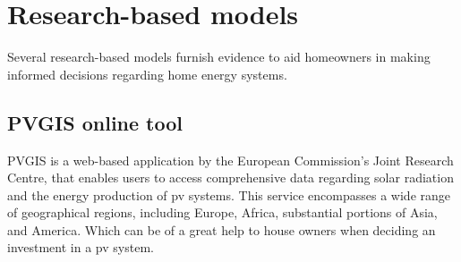 \section{Research-based models}

Several research-based models furnish evidence to aid homeowners in making informed decisions regarding home energy systems.

\subsection{PVGIS online tool}
PVGIS \cite{pvgis} is a web-based application by the European Commission's Joint Research Centre, 
that enables users to access comprehensive data regarding solar radiation and the energy production of \gls{pv} systems. 
This service encompasses a wide range of geographical regions, including Europe, Africa, substantial portions of Asia, and America.
Which can be of a great help to house owners when deciding an investment in a \gls{pv} system. 

